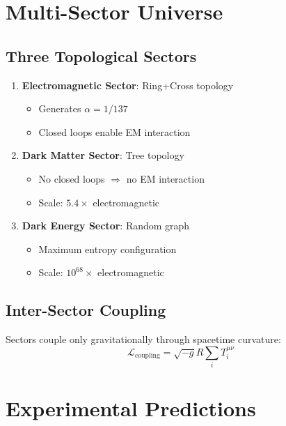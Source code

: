 \documentclass[12pt,a4paper]{article}
\begin{document}
\section{Multi-Sector Universe}

\subsection{Three Topological Sectors}

\begin{enumerate}
\item \textbf{Electromagnetic Sector}: Ring+Cross topology
   \begin{itemize}
   \item Generates $\alpha = 1/137$
   \item Closed loops enable EM interaction
   \end{itemize}
   
\item \textbf{Dark Matter Sector}: Tree topology
   \begin{itemize}
   \item No closed loops $\Rightarrow$ no EM interaction
   \item Scale: $5.4 \times$ electromagnetic
   \end{itemize}
   
\item \textbf{Dark Energy Sector}: Random graph
   \begin{itemize}
   \item Maximum entropy configuration
   \item Scale: $10^{68} \times$ electromagnetic
   \end{itemize}
\end{enumerate}

\subsection{Inter-Sector Coupling}

Sectors couple only gravitationally through spacetime curvature:
\begin{equation}
\mathcal{L}_{\text{coupling}} = \sqrt{-g} R \sum_i T^{\mu\nu}_i
\end{equation}

\section{Experimental Predictions}
\end{document}
